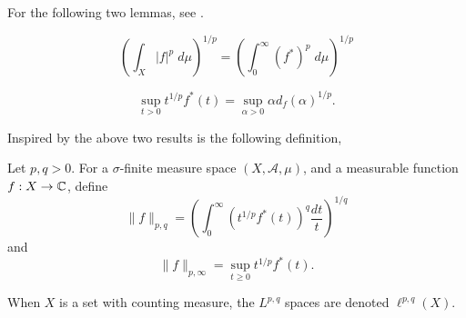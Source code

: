 For the following two lemmas, see \cite{Grafakos1}.
\begin{lemma}
    \begin{equation*}
        \left(\int_X |f|^p\;d\mu\right)^{1/p} = \left(\int_0^\infty (f^*)^p\;d\mu\right)^{1/p}
    \end{equation*}
\end{lemma}
\begin{lemma}
    \begin{equation*}
        \sup_{t>0} t^{1/p}f^*(t) = \sup_{\alpha > 0} \alpha d_f(\alpha)^{1/p}.
    \end{equation*}
\end{lemma}

Inspired by the above two results is the following definition,
\begin{definition}
    Let $p,q > 0$. For a $\sigma$-finite measure space $(X,\mathcal{A},\mu)$, 
    and a measurable function $f:X\rightarrow \mathbb{C}$, define
    \begin{equation*}
        \|f\|_{p,q} = \left(\int_0^\infty (t^{1/p}f^*(t))^q\frac{dt}{t}\right)^{1/q}
    \end{equation*}
    and
    \begin{equation*}
        \|f\|_{p,\infty} = \sup_{t\geq 0} t^{1/p} f^*(t).
    \end{equation*}
\end{definition}

When $X$ is a set with counting measure, the $L^{p,q}$ spaces
are denoted $\ell^{p,q}(X)$. 

